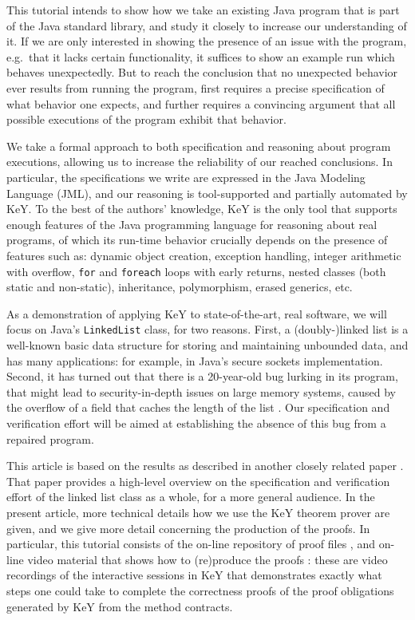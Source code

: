 \documentclass[runningheads]{llncs}
\begin{document}
This tutorial intends to show how we take an existing Java program that is part of the Java standard library, and study it closely to increase our understanding of it. If we are only interested in showing the presence of an issue with the program, e.g.~that it lacks certain functionality, it suffices to show an example run which behaves unexpectedly. But to reach the conclusion that no unexpected behavior ever results from running the program, first requires a precise specification of what behavior one expects, and further requires a convincing argument that all possible executions of the program exhibit that behavior.

We take a formal approach to both specification and reasoning about program executions, allowing us to increase the reliability of our reached conclusions. In particular, the specifications we write are expressed in the Java Modeling Language (JML), and our reasoning is tool-supported and partially automated by KeY. To the best of the authors' knowledge, KeY is the only tool that supports enough features of the Java programming language for reasoning about real programs, of which its run-time behavior crucially depends on the presence of features such as: dynamic object creation, exception handling, integer arithmetic with overflow, \texttt{for} and \texttt{foreach} loops with early returns, nested classes (both static and non-static), inheritance, polymorphism, erased generics, etc.

As a demonstration of applying KeY to state-of-the-art, real software, we will focus on Java's \texttt{LinkedList} class, for two reasons. First, a (doubly-)linked list is a well-known basic data structure for storing and maintaining unbounded data, and has many applications: for example, in Java's secure sockets implementation. Second, it has turned out that there is a 20-year-old bug lurking in its program, that might lead to security-in-depth issues on large memory systems, caused by the overflow of a field that caches the length of the list . Our specification and verification effort will be aimed at establishing the absence of this bug from a repaired program.

This article is based on the results as described in another closely related paper . That paper provides a high-level overview on the specification and verification effort of the linked list class as a whole, for a more general audience. In the present article, more technical details how we use the KeY theorem prover are given, and we give more detail concerning the production of the proofs. In particular, this tutorial consists of the on-line repository of proof files , and on-line video material that shows how to (re)produce the proofs : these are video recordings of the interactive sessions in KeY that demonstrates exactly what steps one could take to complete the correctness proofs of the proof obligations generated by KeY from the method contracts.
\end{document}
